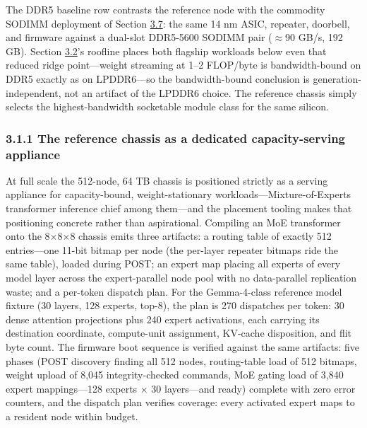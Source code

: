 \documentclass[10pt,twocolumn]{article}
\begin{document}
The DDR5 baseline row contrasts the reference node with the commodity SODIMM deployment of Section \hyperref[sec:3.7]{3.7}: the same 14 nm ASIC, repeater, doorbell, and firmware against a dual-slot DDR5-5600 SODIMM pair ($\approx$90 GB/s, 192 GB). Section \hyperref[sec:3.2]{3.2}'s roofline places both flagship workloads below even that reduced ridge point---weight streaming at 1--2 FLOP/byte is bandwidth-bound on DDR5 exactly as on LPDDR6---so the bandwidth-bound conclusion is generation-independent, not an artifact of the LPDDR6 choice. The reference chassis simply selects the highest-bandwidth socketable module class for the same silicon.

\subsubsection*{3.1.1 The reference chassis as a dedicated capacity-serving appliance}\label{sec:3.1.1}

At full scale the 512-node, 64 TB chassis is positioned strictly as a serving appliance for capacity-bound, weight-stationary workloads---Mixture-of-Experts transformer inference chief among them\cite{27}---and the placement tooling makes that positioning concrete rather than aspirational. Compiling an MoE transformer onto the 8$\times$8$\times$8 chassis emits three artifacts: a routing table of exactly 512 entries---one 11-bit bitmap per node (the per-layer repeater bitmaps ride the same table), loaded during POST; an expert map placing all experts of every model layer across the expert-parallel node pool with no data-parallel replication waste; and a per-token dispatch plan. For the Gemma-4-class reference model fixture (30 layers, 128 experts, top-8), the plan is 270 dispatches per token: 30 dense attention projections plus 240 expert activations, each carrying its destination coordinate, compute-unit assignment, KV-cache disposition, and flit byte count. The firmware boot sequence is verified against the same artifacts: five phases (POST discovery finding all 512 nodes, routing-table load of 512 bitmaps, weight upload of 8,045 integrity-checked commands, MoE gating load of 3,840 expert mappings---128 experts $\times$ 30 layers---and ready) complete with zero error counters, and the dispatch plan verifies coverage: every activated expert maps to a resident node within budget.
\end{document}
